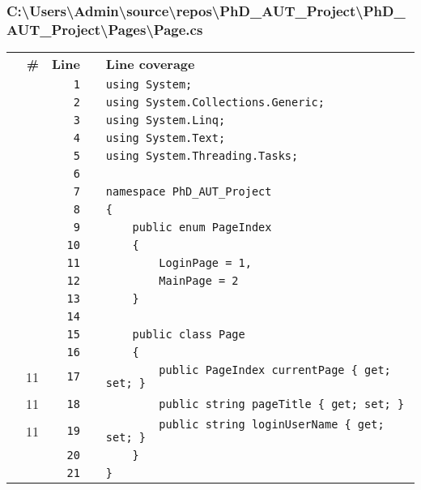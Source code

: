 \documentclass[a4paper,landscape,10pt]{article}
\begin{document}
\subsubsection{C:\textbackslash Users\textbackslash Admin\textbackslash source\textbackslash repos\textbackslash PhD\_AUT\_Project\textbackslash PhD\_AUT\_Project\textbackslash Pages\textbackslash Page.cs}
\begin{longtable}[l]{lrrll}
\textbf{} & \textbf{\#} & \textbf{Line} & \textbf{} & \textbf{Line coverage}\\
\cellcolor{gray} &  & \verb~1~ & & \verb~using System;~\\
\cellcolor{gray} &  & \verb~2~ & & \verb~using System.Collections.Generic;~\\
\cellcolor{gray} &  & \verb~3~ & & \verb~using System.Linq;~\\
\cellcolor{gray} &  & \verb~4~ & & \verb~using System.Text;~\\
\cellcolor{gray} &  & \verb~5~ & & \verb~using System.Threading.Tasks;~\\
\cellcolor{gray} &  & \verb~6~ & & \verb~~\\
\cellcolor{gray} &  & \verb~7~ & & \verb~namespace PhD_AUT_Project~\\
\cellcolor{gray} &  & \verb~8~ & & \verb~{~\\
\cellcolor{gray} &  & \verb~9~ & & \verb~    public enum PageIndex~\\
\cellcolor{gray} &  & \verb~10~ & & \verb~    {~\\
\cellcolor{gray} &  & \verb~11~ & & \verb~        LoginPage = 1,~\\
\cellcolor{gray} &  & \verb~12~ & & \verb~        MainPage = 2~\\
\cellcolor{gray} &  & \verb~13~ & & \verb~    }~\\
\cellcolor{gray} &  & \verb~14~ & & \verb~~\\
\cellcolor{gray} &  & \verb~15~ & & \verb~    public class Page~\\
\cellcolor{gray} &  & \verb~16~ & & \verb~    {~\\
\cellcolor{green} & 11 & \verb~17~ & & \verb~        public PageIndex currentPage { get; set; }~\\
\cellcolor{green} & 11 & \verb~18~ & & \verb~        public string pageTitle { get; set; }~\\
\cellcolor{green} & 11 & \verb~19~ & & \verb~        public string loginUserName { get; set; }~\\
\cellcolor{gray} &  & \verb~20~ & & \verb~    }~\\
\cellcolor{gray} &  & \verb~21~ & & \verb~}~\\
\end{longtable}
\newpage
\end{document}
